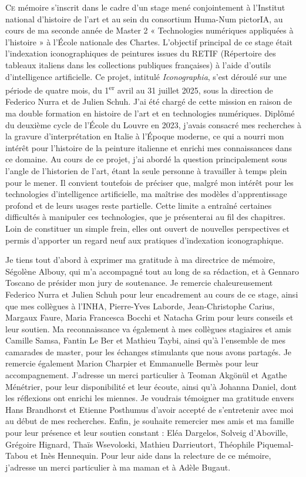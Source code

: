 \lettrine{C}e mémoire s’inscrit dans le cadre d’un stage mené conjointement à l’Institut national d'histoire de l'art et au sein du consortium Huma-Num pictorIA, au cours de ma seconde année de Master 2 « Technologies numériques appliquées à l’histoire » à l’École nationale des Chartes. L’objectif principal de ce stage était l’indexation iconographiques de peintures issues du RETIF (Répertoire des tableaux italiens dans les collections publiques françaises) à l’aide d’outils d’intelligence artificielle. Ce projet, intitulé \textit{Iconographia}, s’est déroulé sur une période de quatre mois, du 1\textsuperscript{er} avril au 31 juillet 2025, sous la direction de Federico Nurra et de Julien Schuh. J’ai été chargé de cette mission en raison de ma double formation en histoire de l’art et en technologies numériques. Diplômé du deuxième cycle de l’École du Louvre en 2023, j'avais consacré mes recherches à la gravure d’interprétation en Italie à l’Époque moderne, ce qui a nourri mon intérêt pour l’histoire de la peinture italienne et enrichi mes connaissances dans ce domaine. Au cours de ce projet, j’ai abordé la question principalement sous l’angle de l’historien de l’art, étant la seule personne à travailler à temps plein pour le mener. Il convient toutefois de préciser que, malgré mon intérêt pour les technologies d’intelligence artificielle, ma maîtrise des modèles d’apprentissage profond et de leurs usages reste partielle. Cette limite a entraîné certaines difficultés à manipuler ces technologies, que je présenterai au fil des chapitres. Loin de constituer un simple frein, elles ont ouvert de nouvelles perspectives et permis d’apporter un regard neuf aux pratiques d’indexation iconographique.

Je tiens tout d’abord à exprimer ma gratitude à ma directrice de mémoire, Ségolène Albouy, qui m’a accompagné tout au long de sa rédaction, et à Gennaro Toscano de présider mon jury de soutenance. Je remercie chaleureusement Federico Nurra et Julien Schuh pour leur encadrement au cours de ce stage, ainsi que mes collègues à l’INHA, Pierre-Yves Laborde, Jean-Christophe Carius, Margaux Faure, Maria Francesca Bocchi et Natacha Grim pour leurs conseils et leur soutien. Ma reconnaissance va également à mes collègues stagiaires et amis Camille Samsa, Fantin Le Ber et Mathieu Taybi, ainsi qu’à l’ensemble de mes camarades de master, pour les échanges stimulants que nous avons partagés. Je remercie également Marion Charpier et Emmanuelle Bermès pour leur accompagnement. J’adresse un merci particulier à Teoman Akgönül et Agathe Ménétrier, pour leur disponibilité et leur écoute, ainsi qu’à Johanna Daniel, dont les réflexions ont enrichi les miennes. Je voudrais témoigner ma gratitude envers Hans Brandhorst et Etienne Posthumus d'avoir accepté de s'entretenir avec moi au début de mes recherches. Enfin, je souhaite remercier mes amis et ma famille pour leur présence et leur soutien constant : Eléa Dargelos, Solveig d’Aboville, Grégoire Hignard, Thaïs Wsevoloski, Mathieu Darrieutort, Théophile Piquemal-Tabou et Inès Hennequin. Pour leur aide dans la relecture de ce mémoire, j'adresse un merci particulier à ma maman et à Adèle Bugaut. 
